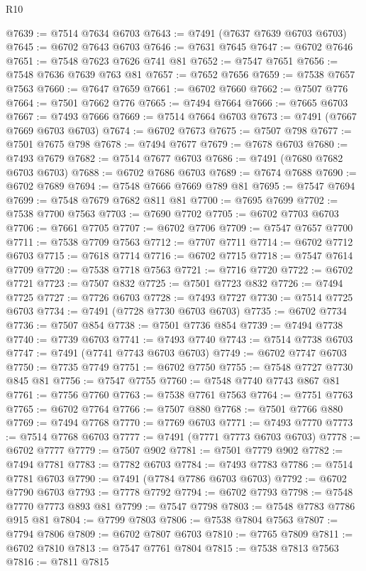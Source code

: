 \begin{lexlean}{R10}
\begin{coremodule}
@7639 := @7514 @7634 @6703
@7643 := @7491 (@7637 @7639 @6703 @6703)
@7645 := @6702 @7643 @6703
@7646 := @7631 @7645
@7647 := @6702 @7646
@7651 := @7548 @7623 @7626 @741 @81
@7652 := @7547 @7651
@7656 := @7548 @7636 @7639 @763 @81
@7657 := @7652 @7656
@7659 := @7538 @7657 @7563
@7660 := @7647 @7659
@7661 := @6702 @7660
@7662 := @7507 @776
@7664 := @7501 @7662 @776
@7665 := @7494 @7664
@7666 := @7665 @6703
@7667 := @7493 @7666
@7669 := @7514 @7664 @6703
@7673 := @7491 (@7667 @7669 @6703 @6703)
@7674 := @6702 @7673
@7675 := @7507 @798
@7677 := @7501 @7675 @798
@7678 := @7494 @7677
@7679 := @7678 @6703
@7680 := @7493 @7679
@7682 := @7514 @7677 @6703
@7686 := @7491 (@7680 @7682 @6703 @6703)
@7688 := @6702 @7686 @6703
@7689 := @7674 @7688
@7690 := @6702 @7689
@7694 := @7548 @7666 @7669 @789 @81
@7695 := @7547 @7694
@7699 := @7548 @7679 @7682 @811 @81
@7700 := @7695 @7699
@7702 := @7538 @7700 @7563
@7703 := @7690 @7702
@7705 := @6702 @7703 @6703
@7706 := @7661 @7705
@7707 := @6702 @7706
@7709 := @7547 @7657 @7700
@7711 := @7538 @7709 @7563
@7712 := @7707 @7711
@7714 := @6702 @7712 @6703
@7715 := @7618 @7714
@7716 := @6702 @7715
@7718 := @7547 @7614 @7709
@7720 := @7538 @7718 @7563
@7721 := @7716 @7720
@7722 := @6702 @7721
@7723 := @7507 @832
@7725 := @7501 @7723 @832
@7726 := @7494 @7725
@7727 := @7726 @6703
@7728 := @7493 @7727
@7730 := @7514 @7725 @6703
@7734 := @7491 (@7728 @7730 @6703 @6703)
@7735 := @6702 @7734
@7736 := @7507 @854
@7738 := @7501 @7736 @854
@7739 := @7494 @7738
@7740 := @7739 @6703
@7741 := @7493 @7740
@7743 := @7514 @7738 @6703
@7747 := @7491 (@7741 @7743 @6703 @6703)
@7749 := @6702 @7747 @6703
@7750 := @7735 @7749
@7751 := @6702 @7750
@7755 := @7548 @7727 @7730 @845 @81
@7756 := @7547 @7755
@7760 := @7548 @7740 @7743 @867 @81
@7761 := @7756 @7760
@7763 := @7538 @7761 @7563
@7764 := @7751 @7763
@7765 := @6702 @7764
@7766 := @7507 @880
@7768 := @7501 @7766 @880
@7769 := @7494 @7768
@7770 := @7769 @6703
@7771 := @7493 @7770
@7773 := @7514 @7768 @6703
@7777 := @7491 (@7771 @7773 @6703 @6703)
@7778 := @6702 @7777
@7779 := @7507 @902
@7781 := @7501 @7779 @902
@7782 := @7494 @7781
@7783 := @7782 @6703
@7784 := @7493 @7783
@7786 := @7514 @7781 @6703
@7790 := @7491 (@7784 @7786 @6703 @6703)
@7792 := @6702 @7790 @6703
@7793 := @7778 @7792
@7794 := @6702 @7793
@7798 := @7548 @7770 @7773 @893 @81
@7799 := @7547 @7798
@7803 := @7548 @7783 @7786 @915 @81
@7804 := @7799 @7803
@7806 := @7538 @7804 @7563
@7807 := @7794 @7806
@7809 := @6702 @7807 @6703
@7810 := @7765 @7809
@7811 := @6702 @7810
@7813 := @7547 @7761 @7804
@7815 := @7538 @7813 @7563
@7816 := @7811 @7815

\end{coremodule}
\end{lexlean}
